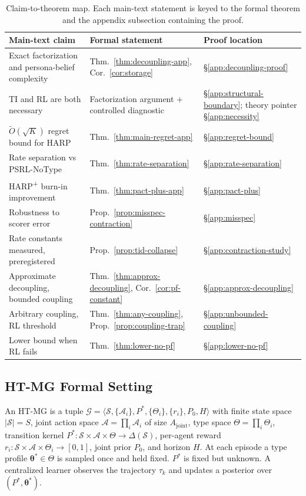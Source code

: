 \begin{table}[h]
\centering\small
\caption{Claim-to-theorem map. Each main-text statement is keyed to the formal theorem and the appendix subsection containing the proof.}
\label{tab:theorem-map}
\setlength{\tabcolsep}{4pt}
\begin{tabular}{@{}p{}p{}p{}@{}}
\toprule
Main-text claim & Formal statement & Proof location \\
\midrule
Exact factorization and persona-belief complexity & Thm.~\ref{thm:decoupling-app}, Cor.~\ref{cor:storage} & \S\ref{app:decoupling-proof} \\
TI and RL are both necessary & Factorization argument $+$ controlled diagnostic & \S\ref{app:structural-boundary}; theory pointer \S\ref{app:necessity} \\
$\tilde O(\sqrt{K})$ regret bound for HARP & Thm.~\ref{thm:main-regret-app} & \S\ref{app:regret-bound} \\
Rate separation vs PSRL-NoType & Thm.~\ref{thm:rate-separation} & \S\ref{app:rate-separation} \\
HARP\textsuperscript{+} burn-in improvement & Thm.~\ref{thm:pact-plus-app} & \S\ref{app:pact-plus} \\
Robustness to scorer error & Prop.~\ref{prop:misspec-contraction} & \S\ref{app:misspec} \\
Rate constants measured, preregistered & Prop.~\ref{prop:tid-collapse} & \S\ref{app:contraction-study} \\
Approximate decoupling, bounded coupling & Thm.~\ref{thm:approx-decoupling}, Cor.~\ref{cor:pf-constant} & \S\ref{app:approx-decoupling} \\
Arbitrary coupling, RL threshold & Thm.~\ref{thm:any-coupling}, Prop.~\ref{prop:coupling-trap} & \S\ref{app:unbounded-coupling} \\
Lower bound when RL fails & Thm.~\ref{thm:lower-no-pf} & \S\ref{app:lower-no-pf} \\
\bottomrule
\end{tabular}
\end{table}

\subsection{HT-MG Formal Setting}
\label{sec:setting-app}

An HT-MG is a tuple $\mathcal{G} = \langle \mathcal{S}, \{\mathcal{A}_i\}, P^*, \{\Theta_i\}, \{r_i\}, P_0, H \rangle$ with finite state space $|\mathcal S|=S$, joint action space $\mathcal A=\prod_i \mathcal A_i$ of size $A_{\mathrm{joint}}$, type space $\Theta=\prod_i \Theta_i$, transition kernel $P^*\!:\!\mathcal S\!\times\!\mathcal A\!\times\!\Theta\to\Delta(\mathcal S)$, per-agent reward $r_i\!:\!\mathcal S\!\times\!\mathcal A\!\times\!\Theta_i\!\to\![0,1]$, joint prior $P_0$, and horizon $H$. At each episode a type profile $\boldsymbol\theta^* \in \Theta$ is sampled once and held fixed. $P^*$ is fixed but unknown. A centralized learner observes the trajectory $\tau_k$ and updates a posterior over $(P^*, \boldsymbol\theta^*)$.

